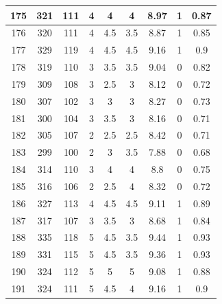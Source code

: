\documentclass[11pt]{article}
\begin{document}
\begin{appendix}
\begin{longtable}[H]{|c|c|c|c|c|c|c|c|c|}
	175        & 321       & 111         & 4                 & 4   & 4   & 8.97 & 1        & 0.87            \\ \hline
	176        & 320       & 111         & 4                 & 4.5 & 3.5 & 8.87 & 1        & 0.85            \\ \hline
	177        & 329       & 119         & 4                 & 4.5 & 4.5 & 9.16 & 1        & 0.9             \\ \hline
	178        & 319       & 110         & 3                 & 3.5 & 3.5 & 9.04 & 0        & 0.82            \\ \hline
	179        & 309       & 108         & 3                 & 2.5 & 3   & 8.12 & 0        & 0.72            \\ \hline
	180        & 307       & 102         & 3                 & 3   & 3   & 8.27 & 0        & 0.73            \\ \hline
	181        & 300       & 104         & 3                 & 3.5 & 3   & 8.16 & 0        & 0.71            \\ \hline
	182        & 305       & 107         & 2                 & 2.5 & 2.5 & 8.42 & 0        & 0.71            \\ \hline
	183        & 299       & 100         & 2                 & 3   & 3.5 & 7.88 & 0        & 0.68            \\ \hline
	184        & 314       & 110         & 3                 & 4   & 4   & 8.8  & 0        & 0.75            \\ \hline
	185        & 316       & 106         & 2                 & 2.5 & 4   & 8.32 & 0        & 0.72            \\ \hline
	186        & 327       & 113         & 4                 & 4.5 & 4.5 & 9.11 & 1        & 0.89            \\ \hline
	187        & 317       & 107         & 3                 & 3.5 & 3   & 8.68 & 1        & 0.84            \\ \hline
	188        & 335       & 118         & 5                 & 4.5 & 3.5 & 9.44 & 1        & 0.93            \\ \hline
	189        & 331       & 115         & 5                 & 4.5 & 3.5 & 9.36 & 1        & 0.93            \\ \hline
	190        & 324       & 112         & 5                 & 5   & 5   & 9.08 & 1        & 0.88            \\ \hline
	191        & 324       & 111         & 5                 & 4.5 & 4   & 9.16 & 1        & 0.9             \\ \hline

\end{longtable}
\end{appendix}
\end{document}
